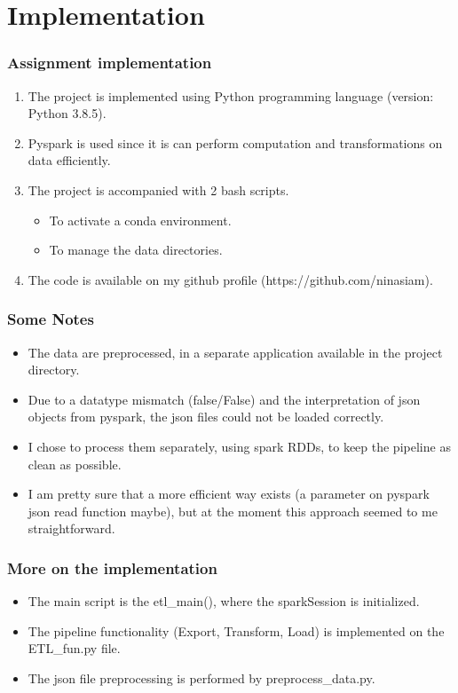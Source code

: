 \documentclass{beamer}
\begin{document}
\section{Implementation}
\begin{frame}
\frametitle{Assignment implementation}
\begin{enumerate}
\item The project is implemented using Python programming language (version: Python 3.8.5).
\item Pyspark is used since it is can perform computation and transformations on data efficiently.
\item The project is accompanied with 2 bash scripts. 
\begin{itemize}
\item To activate a conda environment.
\item To manage the data directories.
\end{itemize}
\item The code is available on my github profile (https://github.com/ninasiam).
\end{enumerate}
\end{frame}

\begin{frame}
\frametitle{Some Notes}
\begin{itemize}
\item The data are preprocessed, in a separate application available in the project directory.
\item Due to a datatype mismatch (false/False) and the interpretation of json objects from pyspark, the json files could not be loaded correctly.
\item I chose to process them separately, using spark RDDs, to keep the pipeline as clean as possible.
\item I am pretty sure that a more efficient way exists (a parameter on pyspark json read function maybe), but at the moment this approach seemed to me straightforward. 
\end{itemize}
\end{frame}

\begin{frame}
\frametitle{More on the implementation}
\begin{itemize}
\item The main script is the etl\_main(), where the sparkSession is initialized.
\item The pipeline functionality (Export, Transform, Load) is implemented on the ETL\_fun.py file.
\item The json file preprocessing is performed by preprocess\_data.py. 
\end{itemize}
\end{frame}
\end{document}
